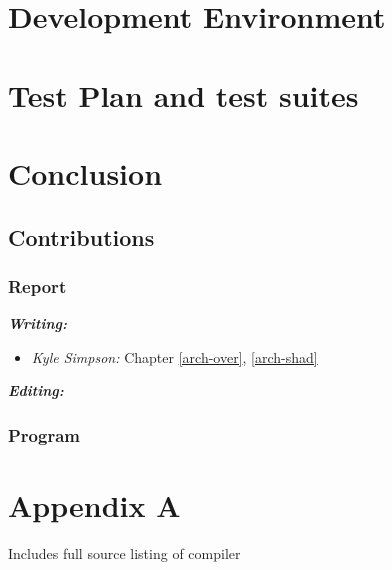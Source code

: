 \documentclass{l3proj}
\begin{document}
\chapter{Development Environment}
\label{dev}

\chapter{Test Plan and test suites}
\label{test}

\chapter{Conclusion}
\label{conc}

\section{Contributions}
\label{cont}

\subsection{Report}
\label{cont-report}

\textit{\textbf{Writing:}}
\begin{itemize}
\item \emph{Kyle Simpson:} Chapter \ref{arch-over}, \ref{arch-shad}
\end{itemize}
\textit{\textbf{Editing:}}
\subsection{Program}
\label{cont-prog}

\chapter{Appendix A}
\label{appa}

Includes full source listing of compiler




\end{document}
